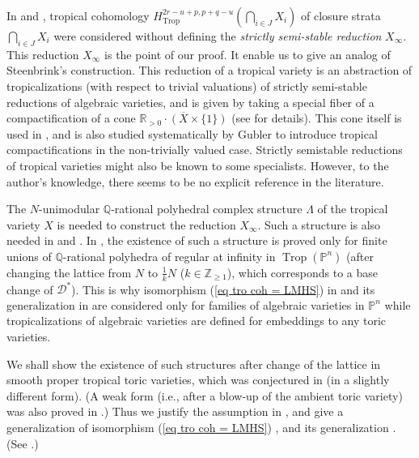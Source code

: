 \documentclass[12pt,a4]{amsart}
\def\P{\mathbb{P}}
\def\R{\mathbb{R}}
\def\Z{\mathbb{Z}}
\def\Q{\mathbb{Q}}
\def\Trop{\mathop{\mathrm{trop}}\nolimits}
\def\Trop{\mathop{\mathrm{Trop}}\nolimits}
\numberwithin{equation}{section}
\numberwithin{figure}{section}
\begin{document}
  In \cite{ItenbergKatzarkovMikhalkinZharkovTropicalhomology2019} 
  and \cite{AminiPiquerezHodgetheoryfortropicalvarieties2020}, 
    tropical cohomology $
  H^{2r-u+p, p+q -u}_{\Trop} (\bigcap_{i \in J} X_i )$
  of closure strata $\bigcap_{i \in J} X_i $ 
  were considered 
  without defining 
   the \emph{strictly semi-stable reduction} $X_{\infty}$.
  This reduction $X_{\infty}$
  is the point of our proof. 
  It 
  enable us to give 
  an analog of Steenbrink's construction.
   This reduction of a tropical variety is an abstraction of tropicalizations (with respect to trivial valuations) of 
   strictly semi-stable reductions of algebraic varieties,
   and is
   given by taking a special fiber of a compactification of 
   a cone $\overline{ \R_{>0 } \cdot ( X\times \{ 1  \} )} $ 
   (see  for details).
  This cone itself 
   is used in \cite{ItenbergKatzarkovMikhalkinZharkovTropicalhomology2019}, 
   and is also studied systematically 
   by Gubler \cite{GublerAguidetotropicalizations2013}
   to introduce tropical compactifications 
   in the non-trivially valued case.
   Strictly semistable reductions of tropical varieties 
    might also be known to some specialists. 
    However, to the author's knowledge, there seems to be no explicit reference in the literature.  

  The $N$-unimodular  
    $\Q$-rational polyhedral complex structure $\Lambda$
    of the tropical variety $X$ 
    is needed to construct the reduction $X_{\infty}$.
    Such a structure is also needed in 
  \cite{ItenbergKatzarkovMikhalkinZharkovTropicalhomology2019}
  and 
   \cite{AminiPiquerezHodgetheoryfortropicalvarieties2020}. 
  In \cite{ItenbergKatzarkovMikhalkinZharkovTropicalhomology2019},
   the existence of such a structure is proved only 
  for finite unions of  $\Q$-rational 
    polyhedra of regular at infinity 
  in $\Trop (\P^n)$ (after changing the lattice from $N $ to $\frac{1}{k}N$ ($k \in \Z_{\geq 1}$), which corresponds to a base change of $\mathcal{D}^{*}$). 
   This is why 
   isomorphism (\ref{eq tro coh = LMHS}) in 
  \cite{ItenbergKatzarkovMikhalkinZharkovTropicalhomology2019}
  and its generalization 
  in \cite{AksnesAminiPiquerezShawCOHOMOLOGICALLYTROPICALVARIETIES2025} 
  are considered only for families of algebraic varieties 
  in $\P^n$
   while tropicalizations of algebraic varieties are 
   defined for embeddings to any toric varieties.

  We shall show the existence of such structures after change of the lattice in smooth proper tropical toric varieties, which was conjectured in  \cite{AminiPiquerezHodgetheoryfortropicalvarieties2020} 
  (in a slightly different form). 
  (A weak form (i.e., after a blow-up of the ambient toric variety) was also proved in \cite{AminiPiquerezHodgetheoryfortropicalvarieties2020}.)
  Thus we 
   justify the assumption in , 
   and give a generalization of isomorphism (\ref{eq tro coh = LMHS})  \cite[Theorem 1]{ItenbergKatzarkovMikhalkinZharkovTropicalhomology2019}, 
   and its generalization 
   \cite[Theorem 7.1]{AksnesAminiPiquerezShawCOHOMOLOGICALLYTROPICALVARIETIES2025}.
  (See .)
\end{document}

